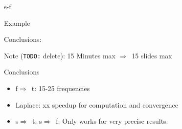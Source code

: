 \documentclass[xcolor=svgnames, usepdftitle=false, aspectratio=169]{beamer}
\newcommand{\dra}{\ensuremath{\Rightarrow }~}
\newcommand{\todo}{{\color{red}\texttt{TODO:}}\xspace}
\begin{document}
\begin{frame}
  {s-f}

  Example
\end{frame}


\begin{frame}
  {Conclusions}:

  Note (\todo delete): 15 Minutes max \dra 15 slides max

  Conclusions
  \begin{itemize}
    \item f\dra t: 15-25 frequencies
    \item Laplace: xx speedup for computation and convergence
    \item s\dra t; s\dra f: Only works for very precise results.
  \end{itemize}
\end{frame}
\end{document}
